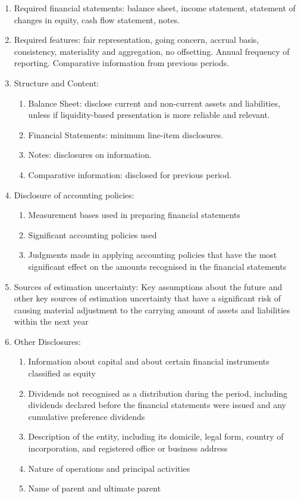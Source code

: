 \begin{remark} 
\begin{enumerate}[label=\roman*.]
\setlength{\itemsep}{0pt}
\item Required financial statements: balance sheet, income statement, statement of changes in equity, cash flow statement, notes.
\item Required features: fair representation, going concern, accrual basis, consistency, materiality and aggregation, no offsetting. Annual frequency of reporting. Comparative information from previous periods.
\item Structure and Content:
\begin{enumerate}[label=\arabic*.]
\setlength{\itemsep}{0pt}
\item Balance Sheet: disclose current and non-current assets and liabilities, unless if liquidity-based presentation is more reliable and relevant.
\item Financial Statements: minimum line-item disclosures.
\item Notes: disclosures on information.
\item Comparative information: disclosed for previous period.
\end{enumerate}
\item Disclosure of accounting policies:
\begin{enumerate}[label=\arabic*.]
\setlength{\itemsep}{0pt}
\item Measurement bases used in preparing financial statements
\item Significant accounting policies used
\item Judgments made in applying accounting policies that have the most significant effect on the amounts recognised in the financial statements
\end{enumerate}
\item Sources of estimation uncertainty: Key assumptions about the future and other key sources of estimation uncertainty that have a significant risk of causing material adjustment to the carrying amount of assets and liabilities within the next year
\item Other Disclosures: 
\begin{enumerate}[label=\arabic*.]
\setlength{\itemsep}{0pt}
\item Information about capital and about certain financial instruments classified as equity
\item Dividends not recognised as a distribution during the period, including dividends declared before the financial statements were issued and any cumulative preference dividends
\item Description of the entity, including its domicile, legal form, country of incorporation, and registered office or business address
\item Nature of operations and principal activities
\item Name of parent and ultimate parent
\end{enumerate}
\end{enumerate}
\end{remark}

